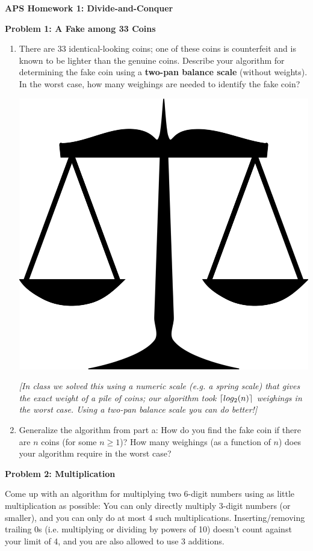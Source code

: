 \documentclass[]{article}
\DeclarePairedDelimiter{\ceil}{\lceil}{\rceil}
\begin{document}
\textbf{APS Homework 1: Divide-and-Conquer}

\medskip
\textbf{Problem 1: A Fake among 33 Coins}
\begin{enumerate}[label=\alph*]
  \item There are $33$ identical-looking coins; one of these coins is counterfeit and is known to be lighter
  than the genuine coins. Describe your algorithm for determining the fake coin using a \textbf{two-pan balance scale}
  (without weights). In the worst case, how many weighings are needed to identify the fake coin?

  \includegraphics[scale=.2]{twoPanBalance}

  \textit{[In class we solved this using a numeric scale (e.g. a spring scale) that gives the exact weight
  of a pile of coins; our algorithm took $\ceil{log_2(n)}$ weighings in the worst case. Using a two-pan balance
  scale you can do better!]}

  \item Generalize the algorithm from part a: How do you find the fake coin if there are $n$ coins
  (for some $n \geq 1$)? How many weighings (as a function of $n$) does
  your algorithm require in the worst case?
\end{enumerate}

\medskip
\textbf{Problem 2: Multiplication}

Come up with an algorithm for multiplying two 6-digit numbers using as little multiplication as possible:
You can only directly multiply 3-digit numbers (or smaller), and you can only do at most 4 such multiplications.
Inserting/removing trailing 0s (i.e. multiplying or dividing by powers of 10) doesn't count against your limit of 4,
and you are also allowed to use 3 additions.
\end{document}
